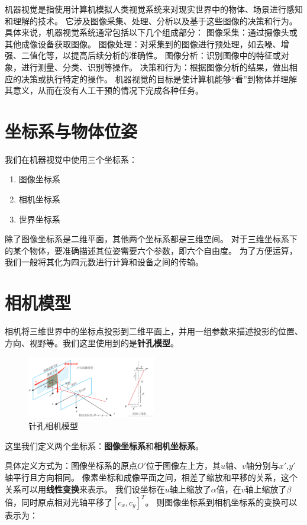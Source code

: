 机器视觉是指使用计算机模拟人类视觉系统来对现实世界中的物体、场景进行感知和理解的技术。
它涉及图像采集、处理、分析以及基于这些图像的决策和行为。
具体来说，机器视觉系统通常包括以下几个组成部分：
图像采集：通过摄像头或其他成像设备获取图像。
图像处理：对采集到的图像进行预处理，如去噪、增强、二值化等，以提高后续分析的准确性。
图像分析：识别图像中的特征或对象，进行测量、分类、识别等操作。
决策和行为：根据图像分析的结果，做出相应的决策或执行特定的操作。
机器视觉的目标是使计算机能够“看”到物体并理解其意义，从而在没有人工干预的情况下完成各种任务。

\section{坐标系与物体位姿}

我们在机器视觉中使用三个坐标系：
\begin{enumerate}
    \item 图像坐标系
    \item 相机坐标系
    \item 世界坐标系
\end{enumerate}
除了图像坐标系是二维平面，其他两个坐标系都是三维空间。
对于三维坐标系下的某个物体，要准确描述其位姿需要六个参数，即六个自由度。
为了方便运算，我们一般将其化为四元数进行计算和设备之间的传输。


\section{相机模型}
相机将三维世界中的坐标点投影到二维平面上，并用一组参数来描述投影的位置、方向、视野等。我们这里使用到的是\textbf{针孔模型}。
\begin{figure}[htbp]
    \centering
\includegraphics[width=0.5\textwidth]{figures/针孔相机.png}
\caption{针孔相机模型}
\end{figure}

这里我们定义两个坐标系：\textbf{图像坐标系}和\textbf{相机坐标系}。

具体定义方式为：图像坐标系的原点$O'$位于图像左上方，其$u$轴、$v$轴分别与$x'$,$y'$轴平行且方向相同。
像素坐标和成像平面之间，相差了缩放和平移的关系，这个关系可以用\textbf{线性变换}来表示。
我们设坐标在$u$轴上缩放了$\alpha$倍，在$v$轴上缩放了$\beta$倍，同时原点相对光轴平移了$[c_x,c_y]^T$。
则图像坐标系到相机坐标系的变换可以表示为：

